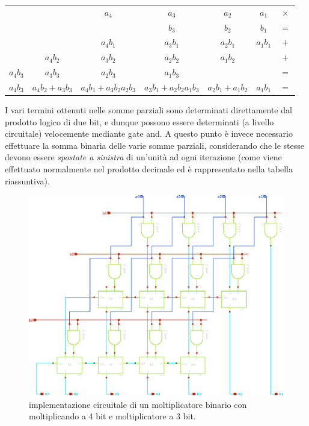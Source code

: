 	\begin{center}
	\begin{tabular}{ c c c c c c c}
		&&$a_4$ & $a_3$ & $a_2$ & $a_1$ & $\times$ \\ 
		&&& $b_3$ & $b_2$ & $b_1$ & $=$ \\ \hline		 
		&&$a_4b_1$ & $a_3b_1$ & $a_2b_1$ & $a_1b_1$ & $+$ \\ 
		&$a_4b_2$ & $a_3b_2$ & $a_2b_2$ & $a_1b_2$ & & $+$ \\
		$a_4b_3$ & $a_3b_3$ & $a_2b_3$ & $a_1b_3$ &&& $=$ \\ \hline
		$a_4b_3$ & $a_4b_2+a_3b_3$ & $a_4b_1+a_3b_2a_2b_3$ & $a_3b_1 + a_2b_2a_1b_3$ & $a_2b_1+a_1b_2$ & $a_1b_1$& $=$ 	
	\end{tabular} 
	\end{center}
	
	I vari termini ottenuti nelle somme parziali sono determinati direttamente dal prodotto logico di due bit, e dunque possono essere determinati (a livello circuitale) velocemente mediante gate and. A questo punto è invece necessario effettuare la somma binaria delle varie somme parziali, considerando che le stesse devono essere \textit{spostate a sinistra} di un'unità ad ogni iterazione (come viene effettuato normalmente nel prodotto decimale ed è rappresentato nella tabella riassuntiva).
	
	\begin{figure}[bht]
		\centering
		\includegraphics[width=\linewidth]{Immagini/moltiplicatore}
		\caption{implementazione circuitale di un moltiplicatore binario con moltiplicando a 4 bit e moltiplicatore a 3 bit. }
		\label{fig:molt:sch}
	\end{figure}
	
